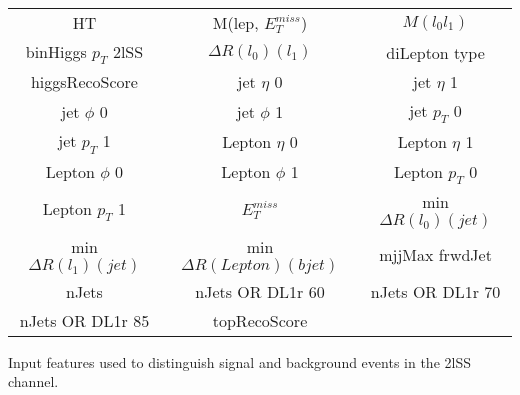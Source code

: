   \begin{center}
  \begin{tabular}{ccc}
    \hline\hline
    HT & M(lep, $E_T^{miss}$) & $M(l_0l_1)$ \\
    binHiggs $p_T$ 2lSS & $\Delta R(l_0)(l_1)$ & diLepton type \\
    higgsRecoScore & jet  $\eta$ 0 & jet  $\eta$ 1 \\
    jet $\phi$ 0 & jet $\phi$ 1 & jet  $p_T$ 0 \\
    jet  $p_T$ 1 & Lepton  $\eta$ 0 & Lepton  $\eta$ 1 \\
    Lepton $\phi$ 0 & Lepton $\phi$ 1 & Lepton  $p_T$ 0 \\
    Lepton  $p_T$ 1 & $E_T^{miss}$ & min $\Delta R(l_0)(jet)$ \\
    min $\Delta R(l_1)(jet)$ & min $\Delta R(Lepton)(bjet)$ & mjjMax frwdJet \\
    nJets & nJets OR DL1r 60 & nJets OR DL1r 70 \\
    nJets OR DL1r 85 & topRecoScore &\\
    \hline
  \end{tabular}
  \end{center}
  \caption{Input features used to distinguish signal and background events in the 2lSS channel.}
  \label{tab:sigBkg2lSSfeatures}
